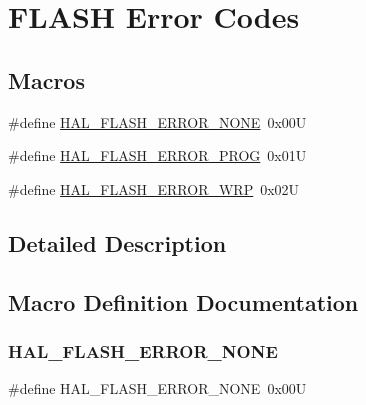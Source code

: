 \hypertarget{group___f_l_a_s_h___error___codes}{}\section{F\+L\+A\+SH Error Codes}
\label{group___f_l_a_s_h___error___codes}
\subsection*{Macros}
\begin{DoxyCompactItemize}
\item 
\#define \hyperlink{group___f_l_a_s_h___error___codes_gae7fb9ee7198d393aba27ade3a9f50a70}{H\+A\+L\+\_\+\+F\+L\+A\+S\+H\+\_\+\+E\+R\+R\+O\+R\+\_\+\+N\+O\+NE}~0x00U
\item 
\#define \hyperlink{group___f_l_a_s_h___error___codes_ga516a75e6f98eed9daefa0b442a74c04b}{H\+A\+L\+\_\+\+F\+L\+A\+S\+H\+\_\+\+E\+R\+R\+O\+R\+\_\+\+P\+R\+OG}~0x01U
\item 
\#define \hyperlink{group___f_l_a_s_h___error___codes_ga27e871d85f9311272098315bc3723075}{H\+A\+L\+\_\+\+F\+L\+A\+S\+H\+\_\+\+E\+R\+R\+O\+R\+\_\+\+W\+RP}~0x02U
\end{DoxyCompactItemize}


\subsection{Detailed Description}


\subsection{Macro Definition Documentation}
\mbox{\label{group___f_l_a_s_h___error___codes_gae7fb9ee7198d393aba27ade3a9f50a70}} 
\subsubsection{\texorpdfstring{H\+A\+L\+\_\+\+F\+L\+A\+S\+H\+\_\+\+E\+R\+R\+O\+R\+\_\+\+N\+O\+NE}{HAL\_FLASH\_ERROR\_NONE}}
{\footnotesize\ttfamily \#define H\+A\+L\+\_\+\+F\+L\+A\+S\+H\+\_\+\+E\+R\+R\+O\+R\+\_\+\+N\+O\+NE~0x00U}

